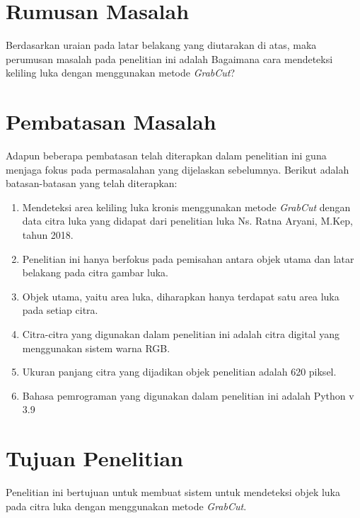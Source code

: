 \section{Rumusan Masalah}
Berdasarkan uraian pada latar belakang yang diutarakan di atas, maka perumusan 
masalah pada penelitian ini adalah Bagaimana cara mendeteksi keliling luka dengan 
menggunakan metode \emph{GrabCut}?

\section{Pembatasan Masalah}
Adapun beberapa pembatasan telah diterapkan dalam penelitian ini guna menjaga fokus 
pada permasalahan yang dijelaskan sebelumnya. Berikut adalah batasan-batasan yang 
telah diterapkan:

\begin{enumerate}
	\item Mendeteksi area keliling luka kronis menggunakan metode \emph{GrabCut} dengan data 
	citra luka yang didapat dari penelitian luka Ns. Ratna Aryani, M.Kep, tahun 2018. 
	\item Penelitian ini hanya berfokus pada pemisahan antara objek utama dan 
	latar belakang pada citra gambar luka.
	\item Objek utama, yaitu area luka, diharapkan hanya terdapat satu area luka pada setiap citra.
	\item Citra-citra yang digunakan dalam penelitian ini adalah citra digital yang menggunakan sistem warna RGB.
	\item Ukuran panjang citra yang dijadikan objek penelitian adalah 620 piksel.
	\item Bahasa pemrograman yang digunakan dalam penelitian ini adalah Python v 3.9
\end{enumerate}

\section{Tujuan Penelitian}
Penelitian ini bertujuan untuk membuat sistem untuk mendeteksi objek luka pada citra luka
dengan menggunakan metode \emph{GrabCut}.


